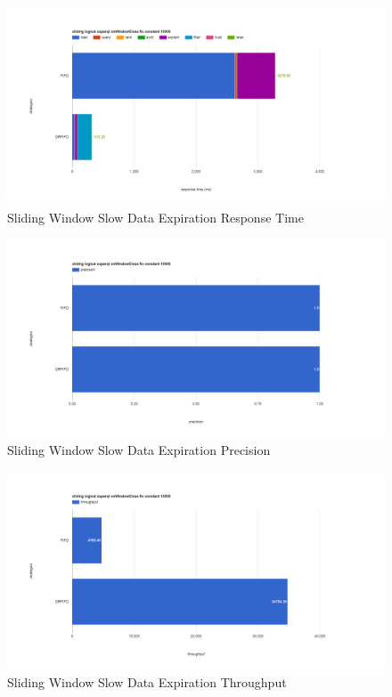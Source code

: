 \begin{figure}[!htbp]
	\centering
    \includegraphics[width=6.5in]{img/app3-slide-slow-r.png}
    \caption{Sliding Window Slow Data Expiration Response Time}
\end{figure}
\begin{figure}[!htbp]
	\centering
    \includegraphics[width=6.5in]{img/app3-slide-slow-p.png}
    \caption{Sliding Window Slow Data Expiration Precision}
\end{figure}
\begin{figure}[!htbp]
	\centering
    \includegraphics[width=6.5in]{img/app3-slide-slow-t.png}
    \caption{Sliding Window Slow Data Expiration Throughput}
\end{figure}
